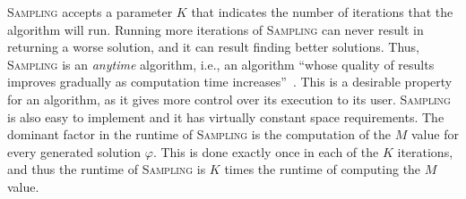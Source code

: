 \documentclass[letterpaper]{article} %
\newcommand{\samd}{\ac{SAMD}\xspace}
\newcommand{\sampling}{\textsc{Sampling}\xspace}
\begin{document}
{%




\sampling accepts a parameter $K$ that indicates the number of iterations that the algorithm will run. Running more iterations of \sampling can never result in returning a worse solution, and it can result finding better solutions. Thus, \sampling is an \emph{anytime} algorithm, i.e., an algorithm
``whose quality of results improves gradually as computation time increases''~\cite{zilberstein1996using}. This is a desirable property for an algorithm, as it gives more control over its execution to its user. 
 \sampling is also easy to implement and it has virtually constant space requirements. The dominant factor in the runtime of \sampling is the computation of the $M$ value for every generated solution $\varphi$. This is done exactly once in each of the $K$ iterations, and thus the runtime of \sampling is $K$ times the runtime of computing the $M$ value. 


}
\end{document}

